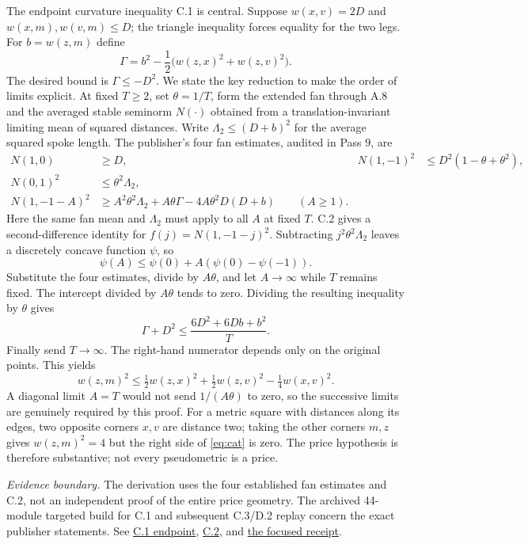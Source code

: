 \documentclass[11pt,letterpaper]{article}
\theoremstyle{definition}\newtheorem{definition}[theorem]{Definition}\newtheorem{example}[theorem]{Example}
\theoremstyle{remark}\newtheorem{remark}[theorem]{Remark}
\newcommand{\pub}[3]{\href{https://github.com/anthropics/formal-math/blob/11b6c7e3c927df2658f513b6b68ea7f8929c62c5/vp-vnp/#1\#L#2}{#3}}
\newcommand{\aud}[2]{\href{https://github.com/nousentllc/VP-VNP-Review/blob/567303d0bcf4f9d54390437b137752446e58ccd6/#1}{#2}}
\newcommand{\scope}[1]{\par\smallskip\noindent\textit{Evidence boundary.} #1\par\smallskip}
\begin{document}
The endpoint curvature inequality C.1 is central. Suppose $w(x,v)=2D$ and $w(x,m),w(v,m)\le D$; the triangle inequality forces equality for the two legs. For $b=w(z,m)$ define
\[
 \Gamma=b^2-\frac12\bigl(w(z,x)^2+w(z,v)^2\bigr).
\]
The desired bound is $\Gamma\le-D^2$. We state the key reduction to make the order of limits explicit. At fixed $T\ge2$, set $\theta=1/T$, form the extended fan through A.8 and the averaged stable seminorm $N(\cdot)$ obtained from a translation-invariant limiting mean of squared distances. Write $\Lambda_2\le(D+b)^2$ for the average squared spoke length. The publisher's four fan estimates, audited in Pass 9, are
\begin{align*}
 N(1,0)&\ge D, &N(1,-1)^2&\le D^2(1-\theta+\theta^2),\\
 N(0,1)^2&\le\theta^2\Lambda_2,\\
 N(1,-1-A)^2&\ge A^2\theta^2\Lambda_2+A\theta\Gamma-4A\theta^2D(D+b)
 \qquad (A\ge1).
\end{align*}
Here the same fan mean and $\Lambda_2$ must apply to all $A$ at fixed $T$. C.2 gives a second-difference identity for $f(j)=N(1,-1-j)^2$. Subtracting $j^2\theta^2\Lambda_2$ leaves a discretely concave function $\psi$, so
\[
 \psi(A)\le\psi(0)+A(\psi(0)-\psi(-1)).
\]
Substitute the four estimates, divide by $A\theta$, and let $A\to\infty$ while $T$ remains fixed. The intercept divided by $A\theta$ tends to zero. Dividing the resulting inequality by $\theta$ gives
\[
 \Gamma+D^2\le \frac{6D^2+6Db+b^2}{T}.
\]
Finally send $T\to\infty$. The right-hand numerator depends only on the original points. This yields
\begin{equation}\label{eq:cat}
 w(z,m)^2\le \tfrac12 w(z,x)^2+\tfrac12 w(z,v)^2-\tfrac14 w(x,v)^2.
\end{equation}
A diagonal limit $A=T$ would not send $1/(A\theta)$ to zero, so the successive limits are genuinely required by this proof. For a metric square with distances along its edges, two opposite corners $x,v$ are distance two; taking the other corners $m,z$ gives $w(z,m)^2=4$ but the right side of \eqref{eq:cat} is zero. The price hypothesis is therefore substantive; not every pseudometric is a price.

\scope{The derivation uses the four established fan estimates and C.2, not an independent proof of the entire price geometry. The archived 44-module targeted build for C.1 and subsequent C.3/D.2 replay concern the exact publisher statements. See \pub{Paper/Fan.lean}{987}{C.1 endpoint}, \pub{Paper/Means.lean}{465}{C.2}, and \aud{checks/pass09_endpoint_replay_results.json}{the focused receipt}.}
\end{document}
